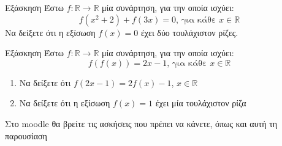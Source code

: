 \documentclass[greek]{beamer}
\begin{document}
\begin{frame}{Εξάσκηση}
 Έστω $f:\mathbb{R}\to\mathbb{R}$ μία συνάρτηση, για την οποία ισχύει:
 $$f(x^2+2)+f(3x)=0 \text{, για κάθε } x\in\mathbb{R}$$
 Να δείξετε ότι η εξίσωση $f(x)=0$ έχει δύο τουλάχιστον ρίζες.
\end{frame}

\begin{frame}{Εξάσκηση}
 Έστω $f:\mathbb{R}\to\mathbb{R}$ μία συνάρτηση, για την οποία ισχύει:
 $$f\left(f(x)\right)=2x-1\text{, για κάθε } x\in\mathbb{R}$$
 \begin{enumerate}
  \item<1-> Να δείξετε ότι $f(2x-1)=2f(x)-1$, $x\in\mathbb{R}$
  \item<2-> Να δείξετε ότι η εξίσωση $f(x)=1$ έχει μία τουλάχιστον ρίζα
 \end{enumerate}
\end{frame}

\begin{frame}
 Στο moodle θα βρείτε τις ασκήσεις που πρέπει να κάνετε, όπως και αυτή τη παρουσίαση
\end{frame}
\end{document}
